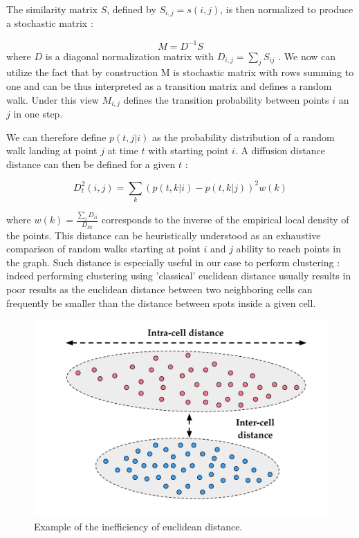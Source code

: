 \documentclass[12pt]{article}
\begin{document}
The similarity matrix $S$, defined by $S_{i,j} = s(i,j)$, is then normalized to produce a stochastic matrix :

\begin{equation}
M = D^{-1}S
\end{equation}
where $D$ is a diagonal normalization matrix with $D_{i,j}=\sum_{j}S_{ij}$ . We now can utilize the fact that by construction M is stochastic matrix with rows summing to one and can be thus interpreted as a transition matrix and defines a random walk. Under this view $M_{i,j}$ defines the transition probability between points $i$ an $j$ in one step.

 We can therefore define $p(t,j|i)$ as the probability distribution of a random walk landing at point $j$ at time $t$ with starting point $i$. A diffusion distance distance can then be defined for a given $t$ :
 
 \begin{equation}
 D_{t}^2(i,j) = \sum_{k}(p(t,k|i)-p(t,k|j))^2w(k)
 \end{equation}

 where $w(k)=\frac{\sum_{i}D_{ii}}{D_{kk}}$ corresponds to the inverse of the empirical local density of the points. This distance can be  heuristically understood as an exhaustive comparison of random walks starting at point $i$ and $j$ ability to reach points in the graph. Such distance is especially useful in our case to perform clustering : indeed performing clustering using 'classical' euclidean distance usually results in poor results as the euclidean distance between two neighboring cells can frequently be smaller than the distance between spots inside a given cell. 
 
\begin{figure}[!h]
	\begin{center}
		\includegraphics[width=0.5\linewidth]{Diffusion_distance.jpg}
		\caption{Example of the inefficiency of euclidean distance.}
		\label{Fig:Diffusion}
	\end{center}
\end{figure}
 
\end{document}

